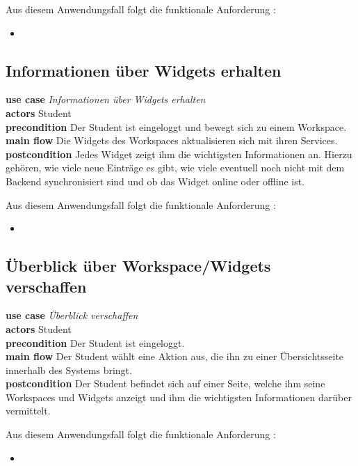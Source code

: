 Aus diesem Anwendungsfall folgt die funktionale Anforderung :
\begin{itemize}
 \item \requirement{\requirementWidgetSortDragNDrop}\label{requirementWidgetSortDragNDrop}
\end{itemize}

\subsection{Informationen über Widgets erhalten}
\textbf{use case} \emph{Informationen über Widgets erhalten}\\
\textbf{actors} Student\\
\textbf{precondition} Der Student ist eingeloggt und bewegt sich zu einem Workspace.\\
\textbf{main flow} Die Widgets des Workspaces aktualisieren sich mit ihren Services. \\
\textbf{postcondition} Jedes Widget zeigt ihm die wichtigsten Informationen an. Hierzu gehören, wie viele neue Einträge es gibt, wie viele eventuell noch nicht mit dem Backend synchronisiert sind und ob das Widget online oder offline ist.
 
Aus diesem Anwendungsfall folgt die funktionale Anforderung :
\begin{itemize}
 \item \requirement{\requirementWidgetInformSystem}\label{requirementWidgetInformSystem}
\end{itemize}

\subsection{Überblick über Workspace/Widgets verschaffen}
\textbf{use case} \emph{Überblick verschaffen}\\
\textbf{actors} Student\\
\textbf{precondition} Der Student ist eingeloggt.\\
\textbf{main flow} Der Student wählt eine Aktion aus, die ihn zu einer Übersichtsseite innerhalb des Systems bringt.\\
\textbf{postcondition} Der Student befindet sich auf einer Seite, welche ihm seine Workspaces und Widgets anzeigt und ihm die wichtigsten Informationen darüber vermittelt.

Aus diesem Anwendungsfall folgt die funktionale Anforderung :
\begin{itemize}
 \item \requirement{\requirementDashboard}\label{requirementDashboard}
\end{itemize}

